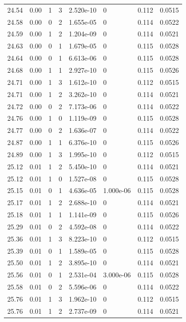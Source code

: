 \documentclass[preview]{standalone}
\begin{document}
{{{{{{{{{{\begin{tabular}{L{1.2cm}C{1.2cm} C{0.3cm}C{0.5cm} C{1.4cm}C{1.4cm} C{1.4cm}C{1.4cm}}
  24.54  &  0.00  & 1     &  3 &  2.520e-10  & 0  & 0.112 &  0.0515   \\ 
  24.58  &  0.00  & 0     &  2 &  1.655e-05  & 0  & 0.114 &  0.0522   \\ 
  24.59  &  0.00  & 1     &  2 &  1.204e-09  & 0  & 0.114 &  0.0521   \\ 
  24.63  &  0.00  & 0     &  1 &  1.679e-05  & 0  & 0.115 &  0.0528   \\ 
  24.64  &  0.00  & 0     &  1 &  6.613e-06  & 0  & 0.115 &  0.0528   \\ 
  24.68  &  0.00  & 1     &  1 &  2.927e-10  & 0  & 0.115 &  0.0526   \\ 
  24.71  &  0.00  & 1     &  3 &  1.612e-10  & 0  & 0.112 &  0.0515   \\ 
  24.71  &  0.00  & 1     &  2 &  3.262e-10  & 0  & 0.114 &  0.0521   \\ 
  24.72  &  0.00  & 0     &  2 &  7.173e-06  & 0  & 0.114 &  0.0522   \\ 
  24.76  &  0.00  & 1     &  0 &  1.119e-09  & 0  & 0.115 &  0.0528   \\ 
  24.77  &  0.00  & 0     &  2 &  1.636e-07  & 0  & 0.114 &  0.0522   \\ 
  24.87  &  0.00  & 1     &  1 &  6.376e-10  & 0  & 0.115 &  0.0526   \\ 
  24.89  &  0.00  & 1     &  3 &  1.995e-10  & 0  & 0.112 &  0.0515   \\ 
  25.12  &  0.01  & 1     &  2 &  5.450e-10  & 0  & 0.114 &  0.0521   \\ 
  25.12  &  0.01  & 1     &  0 &  1.527e-08  & 0  & 0.115 &  0.0528   \\ 
  25.15  &  0.01  & 0     &  1 &  4.636e-05  & 1.000e-06  & 0.115 &  0.0528   \\ 
  25.17  &  0.01  & 1     &  2 &  2.688e-10  & 0  & 0.114 &  0.0521   \\ 
  25.18  &  0.01  & 1     &  1 &  1.141e-09  & 0  & 0.115 &  0.0526   \\ 
  25.29  &  0.01  & 0     &  2 &  4.592e-08  & 0  & 0.114 &  0.0522   \\ 
  25.36  &  0.01  & 1     &  3 &  8.223e-10  & 0  & 0.112 &  0.0515   \\ 
  25.39  &  0.01  & 0     &  1 &  1.589e-05  & 0  & 0.115 &  0.0528   \\ 
  25.50  &  0.01  & 1     &  2 &  3.895e-10  & 0  & 0.114 &  0.0521   \\ 
  25.56  &  0.01  & 0     &  1 &  2.531e-04  & 3.000e-06  & 0.115 &  0.0528   \\ 
  25.58  &  0.01  & 0     &  2 &  5.596e-06  & 0  & 0.114 &  0.0522   \\ 
  25.76  &  0.01  & 1     &  3 &  1.962e-10  & 0  & 0.112 &  0.0515   \\ 
  25.76  &  0.01  & 1     &  2 &  2.737e-09  & 0  & 0.114 &  0.0521   \\ 
\hline 
\end{tabular} 

}}}}}}}}}}
\end{document}
